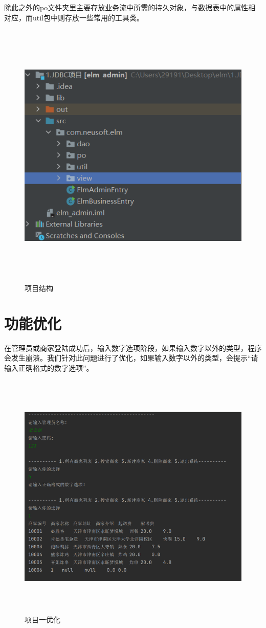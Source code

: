 除此之外的po文件夹里主要存放业务流中所需的持久对象，与数据表中的属性相对应，而util包中则存放一些常用的工具类。

\begin{figure}[H]
    \centering
    \includegraphics[width=15cm,height=13cm]{figures/structure1.png}
    \caption{项目结构}
\end{figure}

\section{功能优化}
在管理员或商家登陆成功后，输入数字选项阶段，如果输入数字以外的类型，程序会发生崩溃。我们针对此问题进行了优化，如果输入数字以外的类型，会提示“请输入正确格式的数字选项”。

\begin{figure}[H]
    \centering
    \includegraphics[width=15cm,height=12cm]{figures/improve1.png}
    \caption{项目一优化}
\end{figure}


